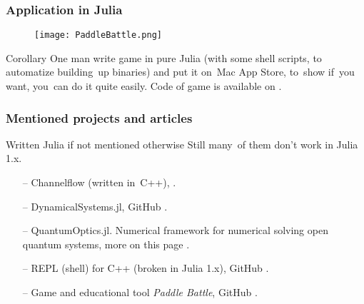 \documentclass{beamer}  %
\begin{document}
\begin{frame}
  \frametitle{Application in Julia}

  \begin{figure}
    \centering

    \texttt{[image: PaddleBattle.png]}
  \end{figure}

  \begin{block}{Corollary}
    One man write game in pure Julia (with some shell scripts, to
    automatize building~up binaries) and put it on~Mac App Store,
    to~show if~you want, you~can do it quite easily. Code of game is
    available on
    .
  \end{block}

\end{frame}





\begin{frame}
  \frametitle{Mentioned projects and articles}

  \begin{block}{Written Julia if not mentioned otherwise}
    Still many~of them don't work in Julia 1.x.
    \begin{itemize}
    \item[--] Channelflow (written in~C++),
      .
    \item[--] DynamicalSystems.jl, GitHub
      .
    \item[--] QuantumOptics.jl. Numerical framework for numerical
      solving open quantum systems, more on this page
      .
    \item[--] REPL (shell) for C++ (broken in Julia 1.x), GitHub
      .
    \item[--] Game and educational tool \emph{Paddle Battle}, GitHub
      .
    \end{itemize}
  \end{block}

\end{frame}






 {}



\end{document}
